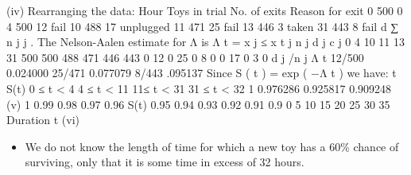 \documentclass[a4paper,12pt]{article}
\begin{document}
(iv)
Rearranging the data:
Hour
Toys in trial
No. of exits
Reason for exit
0
500
0
4
500
12
fail
10
488
17
unplugged
11
471
25
fail
13
446
3
taken
31
443
8
fail
d
∑ n j j .
The Nelson-Aalen estimate for Λ is Λ t =
x j ≤ x
t j n j d j c j
0
4
10
11
13
31 500
500
488
471
446
443 0
12
0
25
0
8 0
0
17
0
3
0
d j /n j Λ t
12/500 0.024000
25/471 0.077079
8/443 .095137
Since S ( t ) = exp ( −Λ t ) we have:
t S(t)
0 ≤ t < 4
4 ≤ t < 11
11≤ t < 31
31 ≤ t < 32 1
0.976286
0.925817
0.909248
(v)
1
0.99
0.98
0.97
0.96
S(t) 0.95
0.94
0.93
0.92
0.91
0.9
0
5
10
15
20
25
30
35
Duration t
(vi)
\begin{itemize}
\item We do not know the length of time for which a new toy has a 60\% chance of
surviving, only that it is some time in excess of 32 hours.
\end{itemize}
\end{document}
